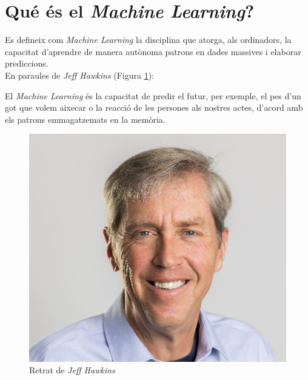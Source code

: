 \documentclass[a4paper,12pt]{report}
\begin{document}
\section*{Qué és el \textit{Machine Learning}?}
Es defineix com \textit{Machine Learning} la disciplina que atorga, als ordinadors, la capacitat d'aprendre de manera autònoma patrons en dades massives i elaborar prediccions.\\
En paraules de \textit{Jeff Hawkins} (Figura \ref{fig:hawkins}):
\begin{center}
    \begin{minipage}{0.9\linewidth}
        \vspace{5pt}
        {\small
            El \textit{Machine Learning} és la capacitat de predir el futur, per exemple, el pes d'un got que volem aixecar o la reacció de les persones als nostres actes, d'acord amb els patrons emmagatzemats en la memòria.
        }
        \vspace{5pt}
    \end{minipage}
\end{center}
\begin{figure}[H]
    \centering
    \includegraphics[scale = 0.3]{images/b2a43a485uokuohjp5l7peo9f0.jpg}
    \caption{Retrat de \textit{Jeff Hawkins}}
    \label{fig:hawkins}
\end{figure}
\end{document}
